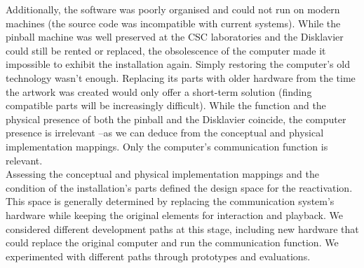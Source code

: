 Additionally, the software was poorly organised and could not run on modern machines (the source code was incompatible with current systems). While the pinball machine was well preserved at the CSC laboratories and the Disklavier could still be rented or replaced, the obsolescence of the computer made it impossible to exhibit the installation again. Simply restoring the computer's old technology wasn't enough. Replacing its parts with older hardware from the time the artwork was created would only offer a short-term solution (finding compatible parts will be increasingly difficult). While the function and the physical presence of both the pinball and the Disklavier coincide, the computer presence is irrelevant –as we can deduce from the conceptual and physical implementation mappings. Only the computer’s communication function is relevant.\\
Assessing the conceptual and physical implementation mappings and the condition of the installation’s parts defined the design space for the reactivation. This space is generally determined by replacing the communication system's hardware while keeping the original elements for interaction and playback. We considered different development paths at this stage, including new hardware that could replace the original computer and run the communication function. We experimented with different paths through prototypes and evaluations.

